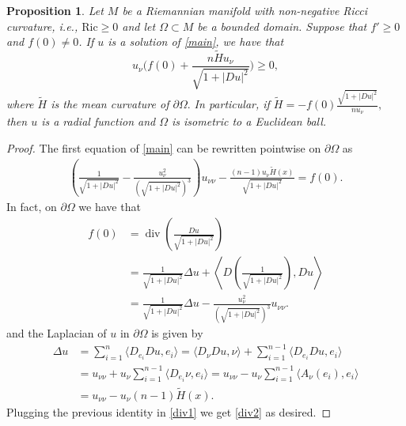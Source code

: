 \documentclass[12pt]{amsart}
\theoremstyle{plain}
\newtheorem{proposition}{\bf Proposition}
\numberwithin{equation}{section}
\begin{document}
\begin{proposition}\label{pfunction2}
    Let \( M \) be a Riemannian manifold with non-negative Ricci curvature, i.e., \( \mathrm{Ric} \geq 0 \) and let $\Omega\subset M$ be a bounded domain. Suppose that $f'\geq 0$ and $f(0)\neq 0$. If $u$ is a solution of \eqref{main}, we have that 
    $$u_{\nu}\bigg(f(0)+\frac{n\widetilde{H}u_\nu}{\sqrt{1+|D u|^2}}\bigg)\geq 0,$$
    where $\widetilde{H}$ is the mean curvature of $\partial\Omega.$
    In particular, if $\widetilde{H}=-f(0)\frac{\sqrt{1+|D u|^2}}{nu_\nu},$ then $u$ is a radial function and $\Omega$ is isometric to a Euclidean ball.
\end{proposition}
\begin{proof}
      The first equation of \eqref{main} can be rewritten pointwise on $\partial\Omega$ as
    \begin{align}\label{div2}
       \left(\frac{1}{\sqrt{1+|D u|^2}}-\frac{u_\nu ^2}{(\sqrt{1+|D u|^2})^3}\right)u_{\nu\nu}-\frac{(n-1)u_\nu \widetilde{H}(x)}{\sqrt{1+|D u|^2}}=f(0).
    \end{align}
    In fact, on $\partial\Omega$ we have that
    \begin{align}\label{div1}
       f(0)&= \operatorname{div}\left(\frac{D u}{\sqrt{1+|D u|^2}}\right)\nonumber\\
       &=\frac{1}{\sqrt{1+|D u|^2}}\Delta u+\left\langle D\left(\frac{1}{\sqrt{1+|D u|^2}}\right),D u\right\rangle\nonumber\\
       &=\frac{1}{\sqrt{1+|D u|^2}}\Delta u -\frac{u_\nu^2}{(\sqrt{1+|D u|^2})^3}u_{\nu\nu}.
    \end{align}
    and the Laplacian of $u$ in $\partial\Omega$ is given by
    \begin{align*}
       \Delta u &= \sum_{i=1}^{n}\langle D_{e_i}Du,e_i\rangle = \langle D_{\nu}D u,\nu\rangle +\sum_{i=1}^{n-1}\langle D_{e_i}D u,e_i\rangle\\
        &=u_{\nu\nu}+u_\nu\sum_{i=1}^{n-1}\langle D_{e_i}\nu,e_i\rangle =u_{\nu\nu}-u_\nu\sum_{i=1}^{n-1}\langle A_\nu(e_i),e_i\rangle\\
        &=u_{\nu\nu}-u_\nu(n-1)\widetilde{H}(x).
    \end{align*}
  Plugging the previous identity in \eqref{div1} we get \eqref{div2} as desired.


\end{proof}
\end{document}
